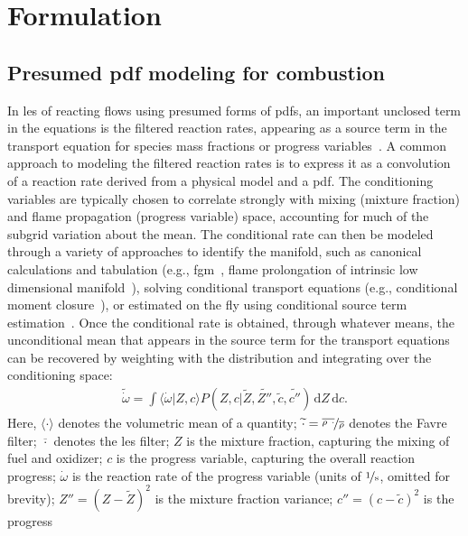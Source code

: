 \documentclass[review]{elsarticle}
\newcommand{\ud}{\,\mathrm{d}}
\newcommand{\wt}[1]{\widetilde{#1}}
\newcommand{\ol}[1]{\overline{#1}}
\begin{document}
\section{Formulation}\label{sec:formulation}

\subsection{Presumed \acrlong{pdf} modeling for combustion}\label{sec:physics}

In \gls{les} of reacting flows using presumed forms of \glspl{pdf}, an
important unclosed term in the equations is the filtered reaction
rates, appearing as a source term in the transport equation for
species mass fractions or progress
variables~\cite{Veynante2002,Pitsch2006a}. A common approach to
modeling the filtered reaction rates is to express it as a convolution
of a reaction rate derived from a physical model and a \gls{pdf}. The
conditioning variables are typically chosen to correlate strongly with
mixing (mixture fraction) and flame propagation (progress variable)
space, accounting for much of the subgrid variation about the
mean. The conditional rate can then be modeled through a variety of
approaches to identify the manifold, such as canonical calculations
and tabulation (e.g., \acrlong{fgm}~\cite{VanOijen2002}, flame
prolongation of intrinsic low dimensional
manifold~\cite{Gicquel2000}), solving conditional transport equations
(e.g., conditional moment closure~\cite{Klimenko1999}), or estimated
on the fly using conditional source term
estimation~\cite{JinGB08}. Once the conditional rate is obtained,
through whatever means, the unconditional mean that appears in the
source term for the transport equations can be recovered by weighting
with the distribution and integrating over the conditioning space:
\begin{align}\label{eq:convolution}
  \wt{\dot{\omega}} = \int \langle \dot{\omega} | Z, c \rangle P(Z,c | \wt{Z}, \wt{Z''}, \wt{c}, \wt{c''}) \ud Z \ud c.
\end{align}
Here, $\langle \cdot \rangle$ denotes the volumetric mean of a
quantity; $\wt{\cdot} = \nicefrac{\ol{\rho~\cdot}}{\ol{\rho}}$ denotes
the Favre filter; $\ol{\cdot}$ denotes the \gls{les} filter; $Z$ is
the mixture fraction, capturing the mixing of fuel and oxidizer; $c$
is the progress variable, capturing the overall reaction progress;
$\dot{\omega}$ is the reaction rate of the progress variable (units of
$\unitfrac{1}{s}$, omitted for brevity); $Z'' = (Z-\wt{Z})^2$ is the
mixture fraction variance; $c'' = (c - \wt{c})^2$ is the progress
\end{document}
